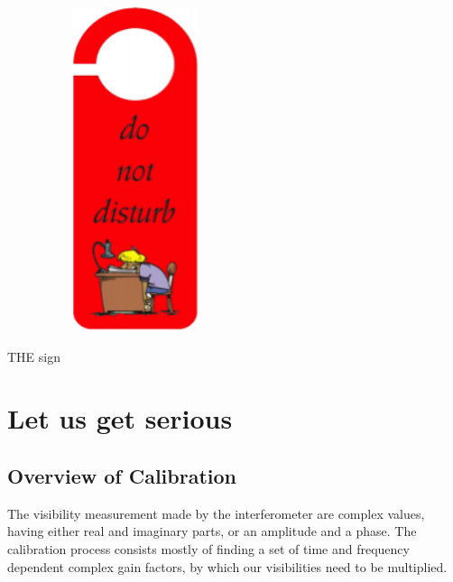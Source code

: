 \documentclass[force,almostfull,justified]{tufte-book}
\begin{document}
  \begin{marginfigure}[-5.0cm]
  \begin{center}
 \includegraphics[width=7.5cm,height=9.5cm]{images/Do_not_disturb} 
 \caption{THE sign}
 \forceversofloat
 \label{fig:marginfig_disturb}
 \end{center}\end{marginfigure}



\chapter{Let us get serious}
\label{ch:let_get_serious}


\bigskip
\section{Overview of Calibration}

The visibility measurement made by the interferometer are complex values, having either real and
imaginary parts, or an amplitude and a phase.  The calibration process consists mostly of finding a
set of time and frequency dependent complex gain factors, by which our visibilities need to be
multiplied.
\end{document}
